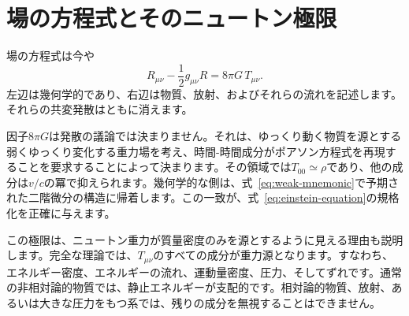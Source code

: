 \begin{classroomqa}
\end{classroomqa}

\begin{classroomqa}
\end{classroomqa}

\section{場の方程式とそのニュートン極限}

場の方程式は今や
\begin{equation}
 \boxed{
 R_{\mu\nu}-\frac12 g_{\mu\nu}R
 =
 8\pi G\,T_{\mu\nu}
 }.
 \label{eq:einstein-equation}
\end{equation}
左辺は幾何学的であり、右辺は物質、放射、およびそれらの流れを記述します。それらの共変発散はともに消えます。

因子\(8\pi G\)は発散の議論では決まりません。それは、ゆっくり動く物質を源とする弱くゆっくり変化する重力場を考え、時間-時間成分がポアソン方程式を再現することを要求することによって決まります。その領域では\(T_{00}\simeq\rho\)であり、他の成分は\(v/c\)の冪で抑えられます。幾何学的な側は、式~\eqref{eq:weak-mnemonic}で予期された二階微分の構造に帰着します。この一致が、式~\eqref{eq:einstein-equation}の規格化を正確に与えます。

この極限は、ニュートン重力が質量密度のみを源とするように見える理由も説明します。完全な理論では、\(T_{\mu\nu}\)のすべての成分が重力源となります。すなわち、エネルギー密度、エネルギーの流れ、運動量密度、圧力、そしてずれです。通常の非相対論的物質では、静止エネルギーが支配的です。相対論的物質、放射、あるいは大きな圧力をもつ系では、残りの成分を無視することはできません。

